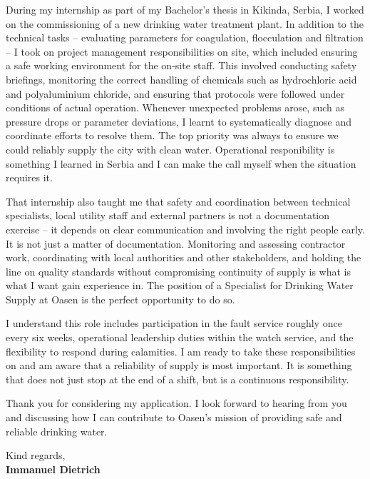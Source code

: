 \documentclass[11pt]{report}
\begin{document}
\begin{titlepage}
During my internship as part of my Bachelor's thesis in Kikinda, Serbia, I worked on the commissioning of a new drinking water treatment plant. In addition to the technical tasks -- evaluating parameters for coagulation, flocculation and filtration -- 
I took on project management responsibilities on site, which included ensuring a safe working environment for the on-site staff. This involved conducting safety briefings, monitoring the correct handling of chemicals such as 
hydrochloric acid and polyaluminium chloride, and ensuring that protocols were followed under conditions of actual operation. Whenever unexpected problems arose, such as pressure drops or parameter deviations, I learnt to systematically 
diagnose and coordinate efforts to resolve them. The top priority was always to ensure we could reliably supply the city with clean water. Operational responibility is something I learned in Serbia and I can make the call myself when the 
situation requires it. 

\vspace{0.7em}

That internship also taught me that safety and coordination between technical specialists, local utility staff and external partners is not a documentation exercise -- it depends on clear communication and involving the right people early. 
It is not just a matter of documentation. Monitoring and assessing contractor work, coordinating with local authorities and other stakeholders, and holding the line on quality standards without compromising continuity of 
supply is what is what I want gain experience in. The position of a Specialist for Drinking Water Supply at Oasen is the perfect opportunity to do so.

\vspace{0.7em}

I understand this role includes participation in the fault service roughly once every six weeks, operational leadership duties within the watch service, and the flexibility to respond during calamities. I am ready to take these responsibilities on and 
am aware that a reliability of supply is most important. It is something that does not just stop at the end of a shift, but is a continuous responsibility.

\vspace{0.7em}

Thank you for considering my application. I look forward to hearing from you and discussing how I can contribute to Oasen's mission of providing safe and reliable drinking water.

\vspace{0.7em}

\raggedright Kind regards,\\
\textbf{Immanuel Dietrich}

\end{titlepage}
\end{document}
